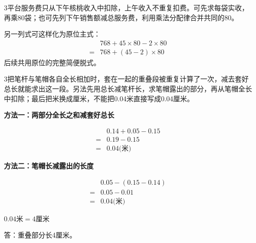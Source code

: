 \documentclass[multi=snippet,border={5bp 20bp 5bp 5bp}]{standalone}
\newenvironment{snippet}[3]{\begin{minipage}{#1bp}\color{answerred}\fontsize{#2}{#3}\selectfont\raggedright}{\end{minipage}}
\begin{document}
\begin{snippet}{505}{11.5}{14}\begin{multicols}{3}\raggedcolumns 平台服务费只从下午核桃收入中扣除，上午收入不重复扣费。可先求每袋实收，再乘80袋；也可先列下午销售额减总服务费，利用乘法分配律合并共同的80。\par 另一列式可这样化为原位主式：\[\begin{aligned}&768+45\times80-2\times80\\={}&768+(45-2)\times80\end{aligned}\]后续共用原位的完整简便脱式。\end{multicols}\end{snippet}
\begin{snippet}{505}{11.5}{14}\begin{multicols}{3}\raggedcolumns 把笔杆与笔帽各自全长相加时，套在一起的重叠段被重复计算了一次，减去套好总长就能求出这一段。另法先用总长减笔杆长，求笔帽露出的部分，再从笔帽全长中扣除；最后把米换成厘米，不能把0.04米直接写成0.04厘米。\par \textbf{方法一：两部分全长之和减套好总长}\par\noindent\[\displaystyle \begin{aligned} &0.14+0.05-0.15\\={}&0.19-0.15\\={}&0.04\text{(米)}\end{aligned}\]\par\textbf{方法二：笔帽长减露出的长度}\par\noindent\[\displaystyle \begin{aligned} &0.05-(0.15-0.14)\\={}&0.05-0.01\\={}&0.04\text{(米)}\end{aligned}\]\par \noindent\(\displaystyle 0.04\text{米}=4\text{厘米}\)\allowbreak \par 答：重叠部分长4厘米。\end{multicols}\end{snippet}
\end{document}
